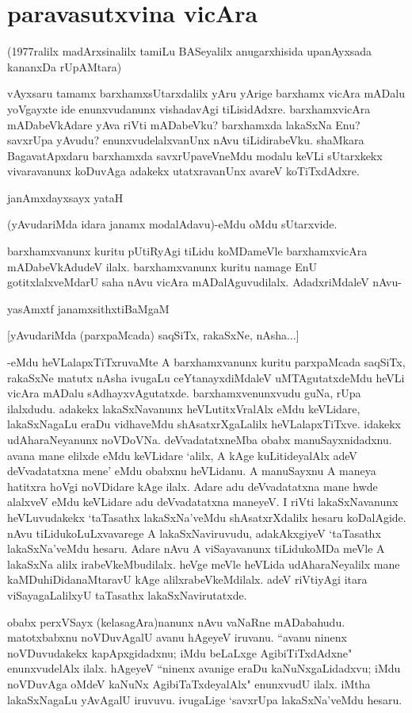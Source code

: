 \chapter{paravasutxvina vicAra}\label{chap13}

(1977ralilx madArxsinalilx tamiLu BASeyalilx anugarxhisida upanAyxsada kananxDa rUpAMtara)

vAyxsaru tamamx barxhamxsUtarxdalilx yAru yArige barxhamx vicAra mADalu yoVgayxte ide enunxvudanunx vishadavAgi tiLisidAdxre. barxhamxvicAra mADabeVkAdare yAva riVti mADabeVku? barxhamxda lakaSxNa Enu? savxrUpa yAvudu? enunxvudelalxvanUnx nAvu tiLidirabeVku. shaMkara BagavatApxdaru barxhamxda savxrUpaveVneMdu modalu keVLi sUtarxkekx vivaravanunx koDuvAga adakekx utatxravanUnx avareV koTiTxdAdxre. 

janAmxdayxsayx yataH

(yAvudariMda idara janamx modalAdavu)-eMdu oMdu sUtarxvide. 

barxhamxvanunx kuritu pUtiRyAgi tiLidu koMDameVle barxhamxvicAra mADabeVkAdudeV ilalx. barxhamxvanunx kuritu namage EnU gotitxlalxveMdarU saha nAvu vicAra mADalAguvudilalx. AdadxriMdaleV nAvu- 

yasAmxtf janamxsithxtiBaMgaM

[yAvudariMda (parxpaMcada) saqSiTx, rakaSxNe, nAsha$\ldots$]

-eMdu heVLalapxTiTxruvaMte A barxhamxvanunx kuritu parxpaMcada saqSiTx, rakaSxNe matutx nAsha ivugaLu ceYtanayxdiMdaleV uMTAgutatxdeMdu heVLi vicAra mADalu sAdhayxvAgutatxde. barxhamxvenunxvudu guNa, rUpa ilalxdudu. adakekx lakaSxNavanunx heVLutitxVralAlx eMdu keVLidare, lakaSxNagaLu eraDu vidhaveMdu shAsatxrXgaLalilx heVLalapxTiTxve. idakekx udAharaNeyanunx noVDoVNa. deVvadatatxneMba obabx manuSayxnidadxnu. avana mane elilxde eMdu keVLidare `alilx, A kAge kuLitideyalAlx adeV deVvadatatxna mene' eMdu obabxnu heVLidanu. A manuSayxnu A maneya hatitxra hoVgi noVDidare kAge ilalx. Adare adu deVvadatatxna mane hwde alalxveV eMdu keVLidare adu deVvadatatxna maneyeV. I riVti lakaSxNavanunx heVLuvudakekx `taTasathx lakaSxNa'veMdu shAsatxrXdalilx hesaru koDalAgide. nAvu tiLidukoLuLxvavarege A lakaSxNaviruvudu, adakAkxgiyeV `taTasathx lakaSxNa'veMdu hesaru. Adare nAvu A viSayavanunx tiLidukoMDa meVle A lakaSxNa alilx irabeVkeMbudilalx. heVge meVle heVLida udAharaNeyalilx mane kaMDuhiDidanaMtaravU kAge alilxrabeVkeMdilalx. adeV riVtiyAgi itara viSayagaLalilxyU taTasathx lakaSxNavirutatxde. 

obabx perxVSayx (kelasagAra)nanunx nAvu vaNaRne mADabahudu. matotxbabxnu noVDuvAgalU avanu hAgeyeV iruvanu. ``avanu ninenx noVDuvudakekx kapApxgidadxnu; iMdu beLaLxge AgibiTiTxdAdxne" enunxvudelAlx ilalx. hAgeyeV ``ninenx avanige eraDu kaNuNxgaLidadxvu; iMdu noVDuvAga oMdeV kaNuNx AgibiTaTxdeyalAlx" enunxvudU ilalx. iMtha lakaSxNagaLu yAvAgalU iruvuvu. ivugaLige `savxrUpa lakaSxNa'veMdu hesaru.

